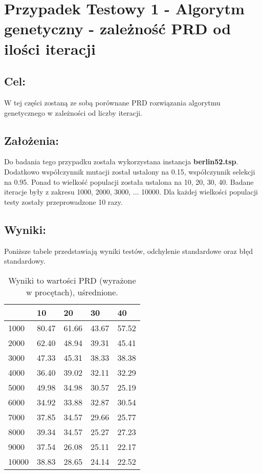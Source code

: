 \section{Przypadek Testowy 1 - Algorytm genetyczny - zależność PRD od ilości iteracji}
  \subsection{Cel:}
    W tej części zostaną ze sobą porównane PRD rozwiązania algorytmu genetycznego w zależności od liczby iteracji.
    \subsection{Założenia:}
    Do badania tego przypadku została wykorzystana instancja \textbf{berlin52.tsp}. Dodatkowo współczynnik mutacji został ustalony na 0.15, współczynnik selekcji na 0.95. Ponad to wielkość populacji została ustalona na {10, 20, 30, 40}. Badane iteracje były z zakresu {1000, 2000, 3000, ... 10000}. Dla każdej wielkości populacji testy zostały przeprowadzone 10 razy.
  \subsection{Wyniki: }
  Poniższe tabele przedstawiają wyniki testów, odchylenie standardowe oraz błęd standardowy. 
  \begin{table}[!ht]
    \centering
    \begin{tabular}{|l|l|l|l|l|}
    \hline
             & 10    & 20    & 30    & 40    \\ \hline
        1000 & 80.47 & 61.66 & 43.67 & 57.52 \\ \hline
        2000 & 62.40 & 48.94 & 39.31 & 45.41 \\ \hline
        3000 & 47.33 & 45.31 & 38.33 & 38.38 \\ \hline
        4000 & 36.40 & 39.02 & 32.11 & 32.29 \\ \hline
        5000 & 49.98 & 34.98 & 30.57 & 25.19 \\ \hline
        6000 & 34.92 & 33.88 & 32.87 & 30.54 \\ \hline
        7000 & 37.85 & 34.57 & 29.66 & 25.77 \\ \hline
        8000 & 39.34 & 34.57 & 25.27 & 27.23 \\ \hline
        9000 & 37.54 & 26.08 & 25.11 & 22.17 \\ \hline
        10000 & 38.83 & 28.65& 24.14 & 22.52 \\ \hline
    \end{tabular}
    \caption{Wyniki to wartości PRD (wyrażone w procętach), uśrednione. }
  \end{table}

